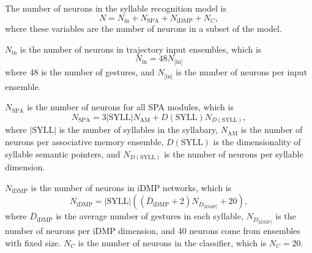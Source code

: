 The number of neurons in the
syllable recognition model is
\begin{equation}
  N = N_{\text{in}} + N_{\text{SPA}} + N_{\text{iDMP}} + N_C,
\end{equation}
where these variables
are the number of neurons in
a subset of the model.

$N_{\text{in}}$ is the number of neurons
in trajectory input ensembles, which is
\begin{equation}
  N_{\text{in}} = 48 N_{|\text{in}|}
\end{equation}
where 48 is the number of gestures,
and $N_{|\text{in}|}$ is the number of neurons
per input ensemble.

$N_{\text{SPA}}$ is the number of
neurons for all SPA modules,
which is
\begin{equation}
  N_{\text{SPA}} = 3 |\text{SYLL}| N_{\text{AM}}
    + D(\text{SYLL}) N_{D(\text{SYLL})},
\end{equation}
where $|\text{SYLL}|$ is the number of
syllables in the syllabary,
$N_{\text{AM}}$ is the number of neurons
per associative memory ensemble,
$D(\text{SYLL})$ is the dimensionality
of syllable semantic pointers,
and $N_{D(\text{SYLL})}$ is the number of neurons
per syllable dimension.

$N_{\text{iDMP}}$ is the number of neurons
in iDMP networks, which is
\begin{equation}
  N_{\text{iDMP}} = |\text{SYLL}| \left( \left(\overline{D}_{\text{iDMP}}
  + 2 \right) N_D_{|\text{iDMP}|} + 20 \right),
\end{equation}
where $\overline{D}_{\text{iDMP}}$ is the average
number of gestures in each syllable,
$N_D_{|\text{iDMP}|}$ is the number of neurons
per iDMP dimension,
and 40 neurons come from ensembles with fixed size.
$N_C$ is the number of neurons
in the classifier,
which is $N_C = 20$.

